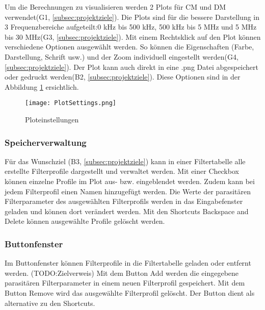 Um die Berechnungen zu visualisieren werden 2 Plots für CM und DM verwendet(G1,  \ref{subsec:projektziele}). Die Plots sind für die bessere Darstellung in 3 Frequenzbereiche aufgeteilt:0 kHz bis 500 kHz, 500 kHz bis 5 MHz und 5 MHz bis 30 MHz(G3,  \ref{subsec:projektziele}). Mit einem Rechtsklick auf den Plot können verschiedene Optionen ausgewählt werden. So können die Eigenschaften (Farbe, Darstellung, Schrift usw.) und der Zoom individuell eingestellt werden(G4,  \ref{subsec:projektziele}). Der Plot kann auch direkt in eine .png Datei abgespeichert oder gedruckt werden(B2,  \ref{subsec:projektziele}). Diese Optionen sind in der Abbildung \ref{fig:PlotSettings} ersichtlich.

\begin{figure}[H]
	\centering
	\texttt{[image: PlotSettings.png]}
	\caption{Ploteinstellungen}
	\label{fig:PlotSettings}
\end{figure} 


\subsubsection{Speicherverwaltung} \label{subsubsec:speicherverwaltung}

Für das Wunschziel (B3,  \ref{subsec:projektziele}) kann in einer Filtertabelle alle erstellte Filterprofile dargestellt und verwaltet werden.  Mit einer Checkbox können einzelne Profile im Plot aus- bzw. eingeblendet werden. Zudem kann bei jedem Filterprofil einen Namen hinzugefügt werden. Die Werte der parasitären Filterparameter des ausgewählten Filterprofils werden in das Eingabefenster geladen und können dort verändert werden. Mit den Shortcuts Backspace and Delete können ausgewählte Profile gelöscht werden.

\subsubsection{Buttonfenster} \label{subsubsec:buttonfenster}

Im Buttonfenster können Filterprofile in die Filtertabelle geladen oder entfernt werden. (TODO:Zielverweis) Mit dem Button Add werden die eingegebene parasitären Filterparameter in einem neuen Filterprofil gespeichert. Mit dem Button Remove wird das ausgewählte Filterprofil gelöscht. Der Button dient als alternative zu den Shortcuts.


